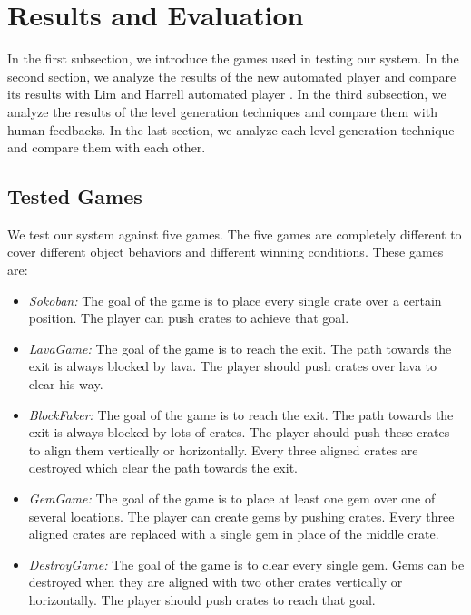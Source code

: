 \documentclass[letterpaper]{article}
\begin{document}
\section{Results and Evaluation}
In the first subsection, we introduce the games used in testing our system. In the second section, we analyze the results of the new automated player and compare its results with Lim and Harrell automated player \cite{puzzleScriptGeneration}. In the third subsection, we analyze the results of the level generation techniques and compare them with human feedbacks. In the last section, we analyze each level generation technique and compare them with each other.

\subsection{Tested Games}
We test our system against five games. The five games are completely different to cover different object behaviors and different winning conditions. These games are:
\begin{itemize} \itemsep0pt \parskip0pt 
	\item \emph{Sokoban:} The goal of the game is to place every single crate over a certain position. The player can push crates to achieve that goal.
	\item \emph{LavaGame:} The goal of the game is to reach the exit. The path towards the exit is always blocked by lava. The player should push crates over lava to clear his way.
	\item \emph{BlockFaker:} The goal of the game is to reach the exit. The path towards the exit is always blocked by lots of crates. The player should push these crates to align them vertically or horizontally. Every three aligned crates are destroyed which clear the path towards the exit.
	\item \emph{GemGame:} The goal of the game is to place at least one gem over one of several locations. The player can create gems by pushing crates. Every three aligned crates are replaced with a single gem in place of the middle crate.
	\item \emph{DestroyGame:} The goal of the game is to clear every single gem. Gems can be destroyed when they are aligned with two other crates vertically or horizontally. The player should push crates to reach that goal.
\end{itemize}
\end{document}
